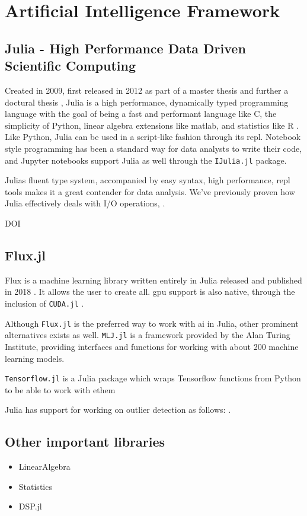 \section{Artificial Intelligence Framework}

\subsection{Julia - High Performance Data Driven Scientific Computing}

Created in 2009, first released in 2012 as part of a master thesis \cite{juliaMs} and further a doctural thesis \cite{juliaPHD}, Julia is a high performance, dynamically typed programming language with the goal of being a fast and performant language like C, the simplicity of Python, linear algebra extensions like matlab, and statistics like R \cite{julia}.  \\ 

Like Python, Julia can be used in a script-like fashion through its \acrfull{repl}. Notebook style programming has been a standard way for data analysts to write their code, and Jupyter notebooks support Julia as well through the \texttt{IJulia.jl} package. 

Julias fluent type system, accompanied by easy syntax, high performance, \acrshort{repl} tools makes it a great contender for data analysis. We've previously proven how Julia effectively deals with I/O operations, \cite{projthesis}.


DOI \cite{doi:10.1137/141000671}

\subsection{Flux.jl}
\label{back:flux}

Flux is a machine learning library written entirely in Julia released and published in 2018 \cite{Flux.jl-2018} \cite{Innes2018}. It allows the user to create all. \acrshort{gpu} support is also native, through the inclusion of \texttt{CUDA.jl} \cite{Besard_2019}. 

Although \texttt{Flux.jl} is the preferred way to work with \acrshort{ai} in Julia, other prominent alternatives exists as well. \texttt{MLJ.jl} \cite{blaom2020flexible} \cite{Blaom2020} is a framework provided by the Alan Turing Institute\texttrademark, providing interfaces and functions for working with about 200 machine learning models. 

\texttt{Tensorflow.jl} is a Julia package which wraps Tensorflow functions from Python to be able to work with ethem


Julia has support for working on outlier detection as follows: \cite{muhr2022outlierdetectionjl}.

\subsection{Other important libraries}

\begin{itemize}
    \item LinearAlgebra
    \item Statistics 
    \item DSP.jl
\end{itemize}

